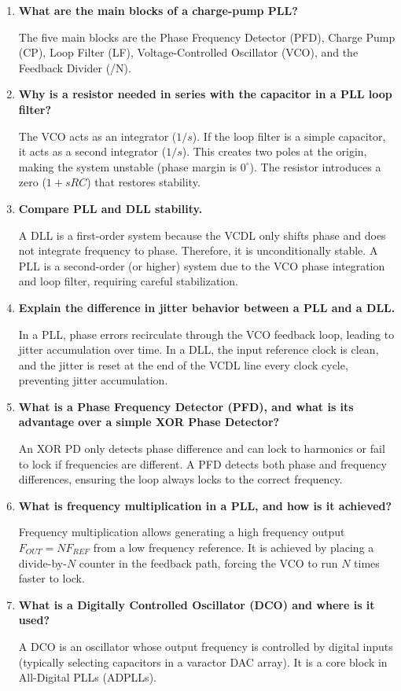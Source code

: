\documentclass[12pt,a4paper]{article}
\newcommand{\Q}[1]{\textbf{#1}\par\noindent\ignorespaces}
\begin{document}
\begin{tcolorbox}[exambox, title={\textbf{Frequently Asked / Viva Questions}}]
\begin{enumerate}[topsep=0pt, label=\textbf{Q\arabic*.}, itemsep=5pt]
  \item \Q{What are the main blocks of a charge-pump PLL?}
    The five main blocks are the Phase Frequency Detector (PFD), Charge Pump (CP), Loop Filter (LF), Voltage-Controlled Oscillator (VCO), and the Feedback Divider (/N).
  \item \Q{Why is a resistor needed in series with the capacitor in a PLL loop filter?}
    The VCO acts as an integrator ($1/s$). If the loop filter is a simple capacitor, it acts as a second integrator ($1/s$). This creates two poles at the origin, making the system unstable (phase margin is $0^\circ$). The resistor introduces a zero ($1+sRC$) that restores stability.
  \item \Q{Compare PLL and DLL stability.}
    A DLL is a first-order system because the VCDL only shifts phase and does not integrate frequency to phase. Therefore, it is unconditionally stable. A PLL is a second-order (or higher) system due to the VCO phase integration and loop filter, requiring careful stabilization.
  \item \Q{Explain the difference in jitter behavior between a PLL and a DLL.}
    In a PLL, phase errors recirculate through the VCO feedback loop, leading to jitter accumulation over time. In a DLL, the input reference clock is clean, and the jitter is reset at the end of the VCDL line every clock cycle, preventing jitter accumulation.
  \item \Q{What is a Phase Frequency Detector (PFD), and what is its advantage over a simple XOR Phase Detector?}
    An XOR PD only detects phase difference and can lock to harmonics or fail to lock if frequencies are different. A PFD detects both phase and frequency differences, ensuring the loop always locks to the correct frequency.
  \item \Q{What is frequency multiplication in a PLL, and how is it achieved?}
    Frequency multiplication allows generating a high frequency output $F_{OUT} = N F_{REF}$ from a low frequency reference. It is achieved by placing a divide-by-$N$ counter in the feedback path, forcing the VCO to run $N$ times faster to lock.
  \item \Q{What is a Digitally Controlled Oscillator (DCO) and where is it used?}
    A DCO is an oscillator whose output frequency is controlled by digital inputs (typically selecting capacitors in a varactor DAC array). It is a core block in All-Digital PLLs (ADPLLs).

\end{enumerate}
\end{tcolorbox}
\end{document}
